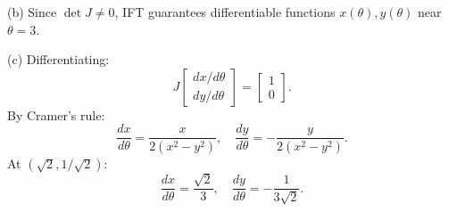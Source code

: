 \documentclass[12pt]{article}
\begin{document}
\begin{enumerate}
(b) Since $\det J\neq 0$, IFT guarantees differentiable functions $x(\theta),y(\theta)$ near $\theta=3$.

(c) Differentiating:
\[
J
\begin{bmatrix}
dx/d\theta \\ dy/d\theta
\end{bmatrix}
=
\begin{bmatrix}
1\\0
\end{bmatrix}.
\]
By Cramer’s rule:
\[
\frac{dx}{d\theta}=\frac{x}{2(x^2-y^2)},\quad
\frac{dy}{d\theta}=-\frac{y}{2(x^2-y^2)}.
\]
At $(\sqrt{2},1/\sqrt{2})$: 
\[
\frac{dx}{d\theta}=\frac{\sqrt{2}}{3},\quad
\frac{dy}{d\theta}=-\frac{1}{3\sqrt{2}}.
\]

\end{enumerate}
\end{document}
